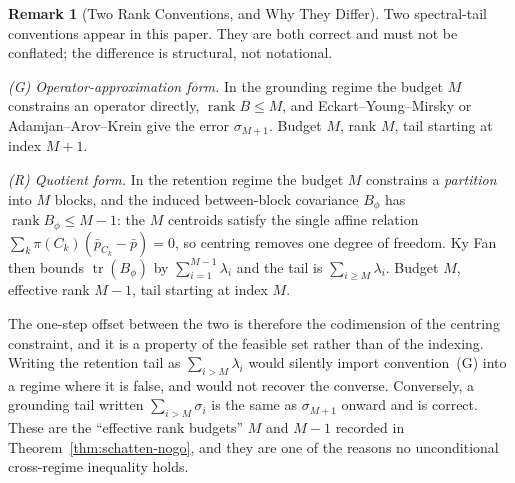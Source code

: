 \documentclass[12pt]{article}
\theoremstyle{definition}
\newtheorem{remark}[theorem]{Remark}
\DeclareMathOperator{\rank}{rank}
\DeclareMathOperator{\tr}{tr}
\begin{document}
\begin{remark}[Two Rank Conventions, and Why They Differ]
\label{rem:rank-conventions}
Two spectral-tail conventions appear in this paper.  They are both correct and
must not be conflated; the difference is structural, not notational.

\emph{(G) Operator-approximation form.}  In the grounding regime the budget $M$
constrains an operator directly, $\rank B\le M$, and Eckart--Young--Mirsky or
Adamjan--Arov--Krein give the error $\sigma_{M+1}$.  Budget $M$, rank $M$,
tail starting at index $M+1$.

\emph{(R) Quotient form.}  In the retention regime the budget $M$ constrains a
\emph{partition} into $M$ blocks, and the induced between-block covariance
$B_\phi$ has $\rank B_\phi\le M-1$: the $M$ centroids satisfy the single affine
relation $\sum_k\pi(C_k)(\bar p_{C_k}-\bar p)=0$, so centring removes one
degree of freedom.  Ky Fan then bounds $\tr(B_\phi)$ by
$\sum_{i=1}^{M-1}\lambda_i$ and the tail is $\sum_{i\ge M}\lambda_i$.  Budget
$M$, effective rank $M-1$, tail starting at index $M$.

The one-step offset between the two is therefore the codimension of the
centring constraint, and it is a property of the feasible set rather than of
the indexing.  Writing the retention tail as $\sum_{i>M}\lambda_i$ would
silently import convention~(G) into a regime where it is false, and would not
recover the converse.  Conversely, a grounding tail written $\sum_{i>M}
\sigma_i$ is the same as $\sigma_{M+1}$ onward and is correct.  These are the
``effective rank budgets'' $M$ and $M-1$ recorded in
Theorem~\ref{thm:schatten-nogo}, and they are one of the reasons no
unconditional cross-regime inequality holds.
\end{remark}
\end{document}
